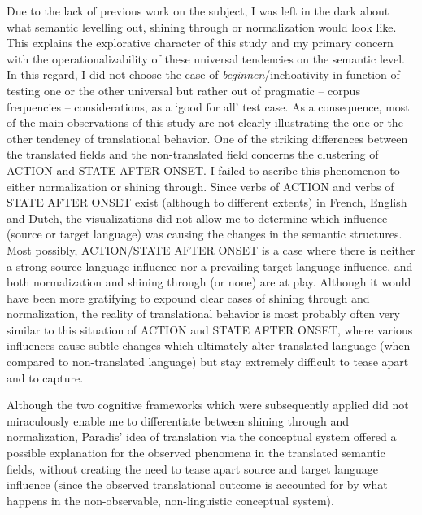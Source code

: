 Due to the lack of previous work on the subject, I was left in the dark about what semantic levelling out, shining through or normalization would look like. This explains the explorative character of this study and my primary concern with the operationalizability of these universal tendencies on the semantic level. In this regard, I did not choose the case of \textit{beginnen}/inchoativity in function of testing one or the other universal but rather out of pragmatic – corpus frequencies – considerations, as a ‘good for all’ test case. As a consequence, most of the main observations of this study are not clearly illustrating the one or the other tendency of translational behavior. One of the striking differences between the translated fields and the non-translated field concerns the clustering of ACTION and STATE AFTER ONSET. I failed to ascribe this phenomenon to either normalization or shining through. Since verbs of ACTION and verbs of STATE AFTER ONSET exist (although to different extents) in French, English and Dutch, the visualizations did not allow me to determine which influence (source or target language) was causing the changes in the semantic structures. Most possibly, ACTION/STATE AFTER ONSET is a case where there is neither a strong source language influence nor a prevailing target language influence, and both normalization and shining through (or none) are at play. Although it would have been more gratifying to expound clear cases of shining through and normalization, the reality of translational behavior is most probably often very similar to this situation of ACTION and STATE AFTER ONSET, where various influences cause subtle changes which ultimately alter translated language (when compared to non-translated language) but stay extremely difficult to tease apart and to capture. 



Although the two cognitive frameworks which were subsequently applied did not miraculously enable me to differentiate between shining through and normalization, Paradis’ idea of translation via the conceptual system offered a possible explanation for the observed phenomena in the translated semantic fields, without creating the need to tease apart source and target language influence (since the observed translational outcome is accounted for by what happens in the non-observable, non-linguistic conceptual system).



